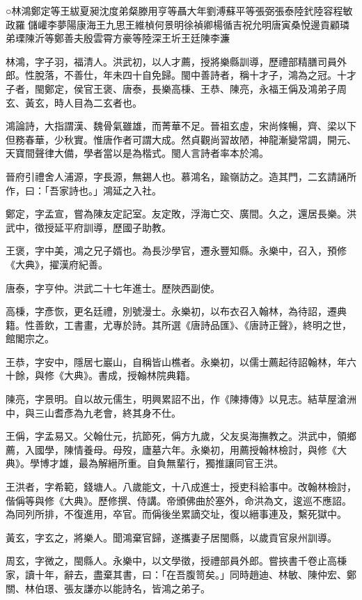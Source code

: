 
\begin{pinyinscope}
○林鴻鄭定等王紱夏昶沈度弟粲滕用亨等聶大年劉溥蘇平等張弼張泰陸釴陸容程敏政羅儲巏李夢陽康海王九思王維楨何景明徐禎卿楊循吉祝允明唐寅桑悅邊貢顧璘弟瑮陳沂等鄭善夫殷雲霄方豪等陸深王圻王廷陳李濂

林鴻，字子羽，福清人。洪武初，以人才薦，授將樂縣訓導，歷禮部精膳司員外郎。性脫落，不善仕，年未四十自免歸。閩中善詩者，稱十才子，鴻為之冠。十才子者，閩鄭定，侯官王褒、唐泰，長樂高棅、王恭、陳亮，永福王偁及鴻弟子周玄、黃玄，時人目為二玄者也。

鴻論詩，大指謂漢、魏骨氣雖雄，而菁華不足。晉祖玄虛，宋尚條暢，齊、梁以下但務春華，少秋實。惟唐作者可謂大成。然貞觀尚習故陋，神龍漸變常調，開元、天寶間聲律大備，學者當以是為楷式。閩人言詩者率本於鴻。

晉府引禮舍人浦源，字長源，無錫人也。慕鴻名，踰嶺訪之。造其門，二玄請誦所作，曰：「吾家詩也。」鴻延之入社。

鄭定，字孟宣，嘗為陳友定記室。友定敗，浮海亡交、廣間。久之，還居長樂。洪武中，徵授延平府訓導，歷國子助教。

王褒，字中美，鴻之兄子婿也。為長沙學官，遷永豐知縣。永樂中，召入，預修《大典》，擢漢府紀善。

唐泰，字亨仲。洪武二十七年進士。歷陜西副使。

高棅，字彥恢，更名廷禮，別號漫士。永樂初，以布衣召入翰林，為待詔，遷典籍。性善飲，工書畫，尤專於詩。其所選《唐詩品匯》、《唐詩正聲》，終明之世，館閣宗之。

王恭，字安中，隱居七巖山，自稱皆山樵者。永樂初，以儒士薦起待詔翰林，年六十餘，與修《大典》。書成，授翰林院典籍。

陳亮，字景明。自以故元儒生，明興累詔不出，作《陳摶傳》以見志。結草屋滄洲中，與三山耆彥為九老會，終其身不仕。

王偁，字孟易又。父翰仕元，抗節死，偁方九歲，父友吳海撫教之。洪武中，領鄉薦，入國學，陳情養母。母歿，廬墓六年。永樂初，用薦授翰林檢討，與修《大典》。學博才雄，最為解縉所重。自負無輩行，獨推讓同官王洪。

王洪者，字希範，錢塘人。八歲能文，十八成進士，授吏科給事中。改翰林檢討，偕偁等與修《大典》。歷修撰、侍講。帝頒佛曲於塞外，命洪為文，逡巡不應詔。為同列所排，不復進用，卒官。而偁後坐累謫交址，復以縉事連及，繫死獄中。

黃玄，字玄之，將樂人。聞鴻棄官歸，遂攜妻子居閩縣，以歲貢官泉州訓導。

周玄，字微之，閩縣人。永樂中，以文學徵，授禮部員外郎。嘗挾書千卷止高棅家，讀十年，辭去，盡棄其書，曰：「在吾腹笥矣。」同時趙迪、林敏、陳仲宏、鄭關、林伯璟、張友謙亦以能詩名，皆鴻之弟子。


\end{pinyinscope}

